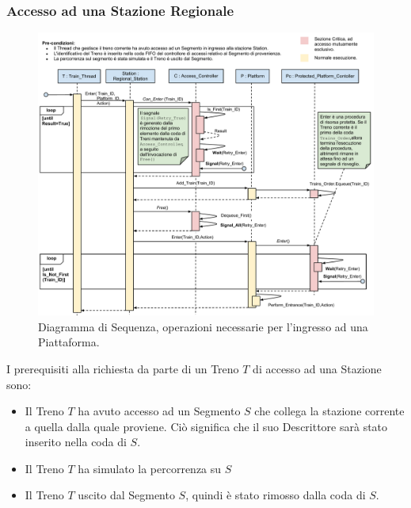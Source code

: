 		\subsubsection{Accesso ad una Stazione Regionale}\label{subsubsec:regional_station_access}
		
		\begin{figure}[htbp]
			\includegraphics[trim = 45mm 0mm 0mm 0mm,scale=0.53]{imgs/platform_access_Sequence_Diagram.pdf}
			\caption{\footnotesize{Diagramma di Sequenza, operazioni necessarie per l'ingresso ad una Piattaforma.}}
			\label{fig:platform_access}
		\end{figure}
		
		I prerequisiti alla richiesta da parte di un Treno $T$ di accesso ad una Stazione sono:
		
			\begin{itemize}
				\item Il Treno $T$ ha avuto accesso ad un Segmento $S$ che collega la stazione corrente a quella dalla quale proviene. Ciò significa che il suo Descrittore sarà stato inserito nella coda  di $S$.
				\item Il Treno $T$ ha simulato la percorrenza su $S$ 
				\item Il Treno $T$ uscito dal Segmento $S$, quindi è stato rimosso dalla coda  di $S$.
			\end{itemize}
			
